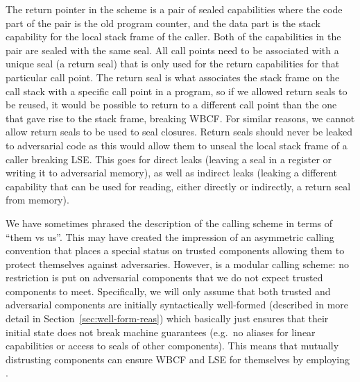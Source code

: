 \documentclass{jfp}
\begin{document}
The return pointer in the \stktokens{} scheme is a pair of sealed capabilities where the code part of the pair is the old program counter, and the data part is the stack capability for the local stack frame of the caller.
Both of the capabilities in the pair are sealed with the same seal.
All call points need to be associated with a unique seal (a return seal) that is only used for the return capabilities for that particular call point.
The return seal is what associates the stack frame on the call stack with a specific call point in a program, so if we allowed return seals to be reused, it would be possible to return to a different call point than the one that gave rise to the stack frame, breaking WBCF.
For similar reasons, we cannot allow return seals to be used to seal closures.
Return seals should never be leaked to adversarial code as this would allow them to unseal the local stack frame of a caller breaking LSE.
This goes for direct leaks (leaving a seal in a register or writing it to adversarial memory), as well as indirect leaks (leaking a different capability that can be used for reading, either directly or indirectly, a return seal from memory).

We have sometimes phrased the description of the \stktokens{} calling scheme in terms of ``them vs us''.
This may have created the impression of an asymmetric calling convention that places a special status on trusted components allowing them to protect themselves against adversaries.
However, \stktokens{} is a modular calling scheme: no restriction is put on adversarial components that we do not expect trusted components to meet.
Specifically, we will only assume that both trusted and adversarial components are initially syntactically well-formed (described in more detail in Section~\ref{sec:well-form-reas}) which basically just ensures that their initial state does not break machine guarantees (e.g.\ no aliases for linear capabilities or access to seals of other components).
This means that mutually distrusting components can ensure WBCF and LSE for themselves by employing \stktokens{}.

\end{document}
